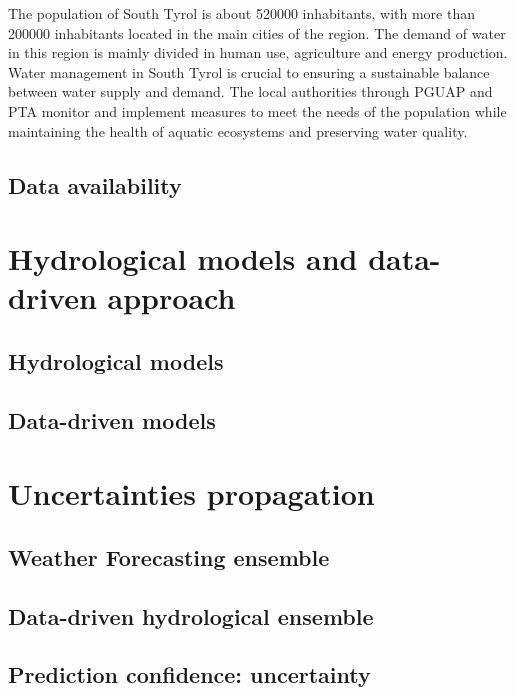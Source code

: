 The population of South Tyrol is about 520000 inhabitants, with more than 200000 inhabitants located in the main cities of the region. The demand of water in this region is mainly divided in human use, agriculture and energy production. Water management in South Tyrol is crucial to ensuring a sustainable balance between water supply and demand. The local authorities through PGUAP and PTA monitor and implement measures to meet the needs of the population while maintaining the health of aquatic ecosystems and preserving water quality.



\subsection{Data availability}

\section{Hydrological models and data-driven approach\label{section1.5}}  

\subsection{Hydrological models}
\subsection{Data-driven models}


\section{Uncertainties propagation\label{section1.6}}  

\subsection{Weather Forecasting ensemble}

\subsection{Data-driven hydrological ensemble}

\subsection{Prediction confidence: uncertainty}
